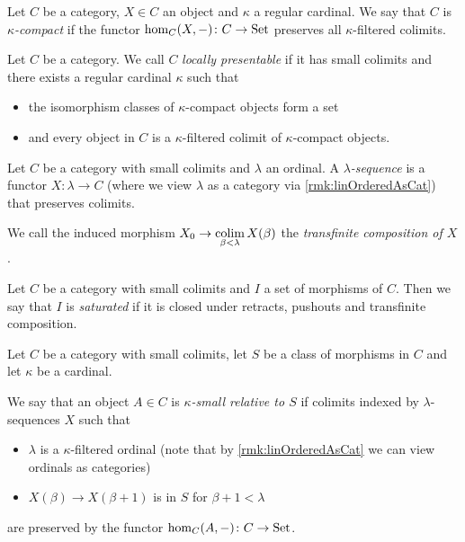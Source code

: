 \begin{definition}\label{def:kappaCompactObject}
    Let $C$ be a category, $X\in C$ an object and $\kappa$ a regular cardinal.
    We say that $C$ is \emph{$\kappa$-compact} if the functor $\hom_C(X,-)\colon C\to\operatorname{Set}$ preserves all $\kappa$-filtered colimits.
\end{definition}
\begin{definition} %
    Let $C$ be a category.
    We call $C$ \emph{locally presentable} if it has small colimits and there exists a regular cardinal $\kappa$ such that
    \begin{itemize}
        \item the isomorphism classes of $\kappa$-compact objects form a set
        \item and every object in $C$ is a $\kappa$-filtered colimit of $\kappa$-compact objects.
    \end{itemize}
\end{definition}
\begin{definition} %
    Let $C$ be a category with small colimits and $\lambda$ an ordinal.
    A \emph{$\lambda$-sequence} is a functor $X\colon\lambda\to C$ (where we view $\lambda$ as a category via \cref{rmk:linOrderedAsCat}) that preserves colimits.

    We call the induced morphism $X_0\to\operatorname*{colim}\limits_{\beta<\lambda} X(\beta)$ the \emph{transfinite composition of $X$}.
\end{definition}
\begin{definition}
    Let $C$ be a category with small colimits and $I$ a set of morphisms of $C$.
    Then we say that $I$ is \emph{saturated} if it is closed under retracts, pushouts and transfinite composition.
\end{definition}
\begin{definition} %
    Let $C$ be a category with small colimits, let $S$ be a class of morphisms in $C$ and let $\kappa$ be a cardinal.
    
    We say that an object $A\in C$ is \emph{$\kappa$-small relative to $S$} if colimits indexed by $\lambda$-sequences $X$ such that 
    \begin{itemize}
        \item $\lambda$ is a $\kappa$-filtered ordinal (note that by \cref{rmk:linOrderedAsCat} we can view ordinals as categories)
        \item $X(\beta)\to X(\beta+1)$ is in $S$ for $\beta+1<\lambda$
    \end{itemize}
    are preserved by the functor $\hom_C(A,-)\colon C\to\operatorname{Set}$.
\end{definition}
